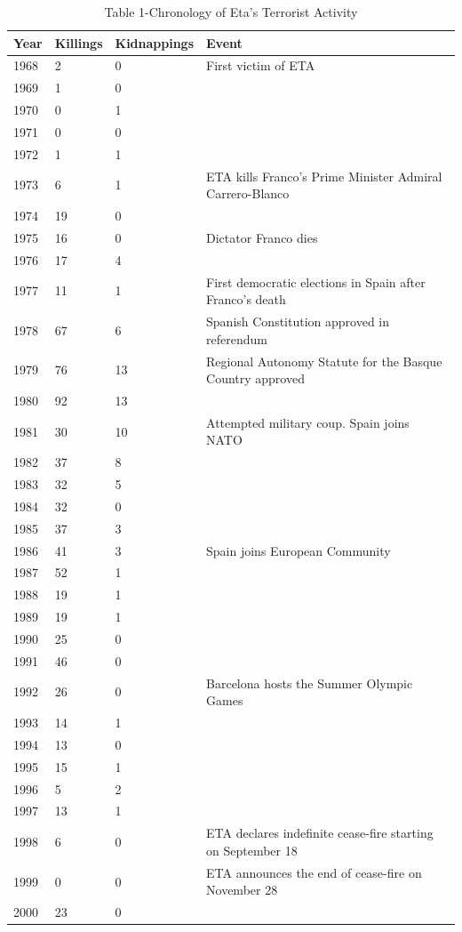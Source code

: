 \documentclass[10pt]{article}
\begin{document}
\begin{table}[h]
\begin{center}
\captionsetup{labelformat=empty}
\caption{Table 1-Chronology of Eta's Terrorist Activity}
\begin{tabular}{|l|l|l|l|}
\hline
Year & Killings & Kidnappings & Event \\
\hline
1968 & 2 & 0 & First victim of ETA \\
\hline
1969 & 1 & 0 &  \\
\hline
1970 & 0 & 1 &  \\
\hline
1971 & 0 & 0 &  \\
\hline
1972 & 1 & 1 &  \\
\hline
1973 & 6 & 1 & ETA kills Franco's Prime Minister Admiral Carrero-Blanco \\
\hline
1974 & 19 & 0 &  \\
\hline
1975 & 16 & 0 & Dictator Franco dies \\
\hline
1976 & 17 & 4 &  \\
\hline
1977 & 11 & 1 & First democratic elections in Spain after Franco's death \\
\hline
1978 & 67 & 6 & Spanish Constitution approved in referendum \\
\hline
1979 & 76 & 13 & Regional Autonomy Statute for the Basque Country approved \\
\hline
1980 & 92 & 13 &  \\
\hline
1981 & 30 & 10 & Attempted military coup. Spain joins NATO \\
\hline
1982 & 37 & 8 &  \\
\hline
1983 & 32 & 5 &  \\
\hline
1984 & 32 & 0 &  \\
\hline
1985 & 37 & 3 &  \\
\hline
1986 & 41 & 3 & Spain joins European Community \\
\hline
1987 & 52 & 1 &  \\
\hline
1988 & 19 & 1 &  \\
\hline
1989 & 19 & 1 &  \\
\hline
1990 & 25 & 0 &  \\
\hline
1991 & 46 & 0 &  \\
\hline
1992 & 26 & 0 & Barcelona hosts the Summer Olympic Games \\
\hline
1993 & 14 & 1 &  \\
\hline
1994 & 13 & 0 &  \\
\hline
1995 & 15 & 1 &  \\
\hline
1996 & 5 & 2 &  \\
\hline
1997 & 13 & 1 &  \\
\hline
1998 & 6 & 0 & ETA declares indefinite cease-fire starting on September 18 \\
\hline
1999 & 0 & 0 & ETA announces the end of cease-fire on November 28 \\
\hline
2000 & 23 & 0 &  \\
\hline
\end{tabular}
\end{center}
\end{table}
\end{document}
